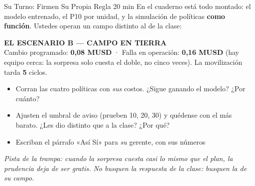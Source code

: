 \documentclass[aspectratio=169, 11pt]{beamer}
\begin{document}
\begin{frame}[shrink=22]{Su Turno: Firmen Su Propia Regla \hfill {\normalsize\color{arcaRed}\faClock\hspace{4pt}20 min}}
  \vspace{-2pt}
  {\footnotesize\color{textMuted}
  En el cuaderno está todo montado: el modelo entrenado, el P10 por
  unidad, y la simulación de políticas \textbf{como función}. Ustedes
  operan un campo distinto al de la clase:}
  \vspace{6pt}
  \begin{tcolorbox}[colback=arcaGray, colframe=arcaDark, boxrule=0pt, leftrule=3pt,
    arc=3pt, left=8pt, right=8pt, top=5pt, bottom=5pt]
    {\scriptsize\color{arcaDark}\bfseries EL ESCENARIO B --- CAMPO EN TIERRA}\\[4pt]
    {\scriptsize\color{textMuted}
     Cambio programado: \textbf{0,08 MUSD} · Falla en operación:
     \textbf{0,16 MUSD} (hay equipo cerca: la sorpresa solo cuesta el
     doble, no cinco veces). La movilización tarda \textbf{5} ciclos.}
  \end{tcolorbox}
  \vspace{6pt}
  {\footnotesize\color{textMuted}
  \begin{itemize}\setlength{\itemsep}{5pt}
    \item[{\color{arcaRed}\scriptsize 1.}]
      Corran las cuatro políticas con \emph{sus} costos. ¿Sigue ganando
      el modelo? ¿Por cuánto?
    \item[{\color{arcaRed}\scriptsize 2.}]
      Ajusten el umbral de aviso (prueben 10, 20, 30) y quédense con el
      más barato. ¿Les dio distinto que a la clase? ¿Por qué?
    \item[{\color{arcaRed}\scriptsize 3.}]
      Escriban el párrafo «Así Sí» para \emph{su} gerente, con sus
      números
  \end{itemize}}
  \vspace{5pt}
  {\scriptsize\color{arcaDark}\itshape
   Pista de la trampa: cuando la sorpresa cuesta casi lo mismo que el
   plan, la prudencia deja de ser gratis. No busquen la respuesta de la
   clase: busquen la de su campo.}
\end{frame}
\end{document}
